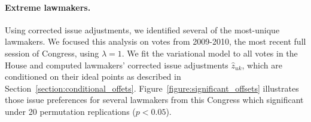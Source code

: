 

\paragraph{Extreme lawmakers.}

Using corrected issue adjustments, we identified several of the
most-unique lawmakers.  We focused this analysis on votes from
2009-2010, the most recent full session of Congress, using
$\lambda=1$.  We fit the variational model to all votes in the House
and computed lawmakers' corrected issue adjustments $\hat z_{uk}$, which are
conditioned on their ideal points as described in
Section~\ref{section:conditional_offets}.
Figure~\ref{figure:significant_offsets} illustrates those issue
preferences for several lawmakers from this Congress which significant
under 20 permutation replications ($p < 0.05$).


